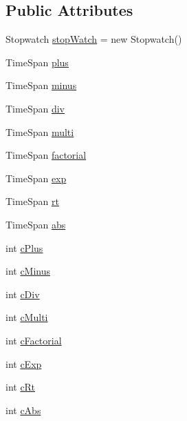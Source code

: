 \subsection*{Public Attributes}
\begin{DoxyCompactItemize}
\item 
Stopwatch \hyperlink{classProfiler_1_1ProfilerCounters_a39d6525c2377e935b8dbb991dccd319e}{stop\+Watch} = new Stopwatch()
\item 
Time\+Span \hyperlink{classProfiler_1_1ProfilerCounters_a7d3db6b95783e38c6af22eb8a96655b7}{plus}
\item 
Time\+Span \hyperlink{classProfiler_1_1ProfilerCounters_a8fafabb72b52ee4fe518dfa803987674}{minus}
\item 
Time\+Span \hyperlink{classProfiler_1_1ProfilerCounters_a88a43c3286acaa9a9b31e8da1e6ab08b}{div}
\item 
Time\+Span \hyperlink{classProfiler_1_1ProfilerCounters_a04ada23a85d484895410801cb6b43b7b}{multi}
\item 
Time\+Span \hyperlink{classProfiler_1_1ProfilerCounters_ad05d759e3653355bdd704f5dc275eabf}{factorial}
\item 
Time\+Span \hyperlink{classProfiler_1_1ProfilerCounters_abad0de31b0381edeaaa6d2f945a1de85}{exp}
\item 
Time\+Span \hyperlink{classProfiler_1_1ProfilerCounters_a86dc3e4fb8757b2816bfaa96931879e2}{rt}
\item 
Time\+Span \hyperlink{classProfiler_1_1ProfilerCounters_a4d3daf11d3674a9a7e3059ad4a574539}{abs}
\item 
int \hyperlink{classProfiler_1_1ProfilerCounters_aaba97dd01339f4df521407075ed0a8f7}{c\+Plus}
\item 
int \hyperlink{classProfiler_1_1ProfilerCounters_a8ce1546f955f1762fed556e1e2fba05c}{c\+Minus}
\item 
int \hyperlink{classProfiler_1_1ProfilerCounters_adcfca54ec5af6974eff30050a464c9ce}{c\+Div}
\item 
int \hyperlink{classProfiler_1_1ProfilerCounters_a9c4ae57f6ac24ddba8683f2ec20ef01e}{c\+Multi}
\item 
int \hyperlink{classProfiler_1_1ProfilerCounters_a5ed597ac77188ce80c60302bbb9cecb3}{c\+Factorial}
\item 
int \hyperlink{classProfiler_1_1ProfilerCounters_a43957d1742ddff1189f03a5698182d97}{c\+Exp}
\item 
int \hyperlink{classProfiler_1_1ProfilerCounters_a008c52db50c5803adb952f057bc602b8}{c\+Rt}
\item 
int \hyperlink{classProfiler_1_1ProfilerCounters_aa6b6f602ee8cb41c9c8c92c2ae21fbe6}{c\+Abs}
\end{DoxyCompactItemize}


